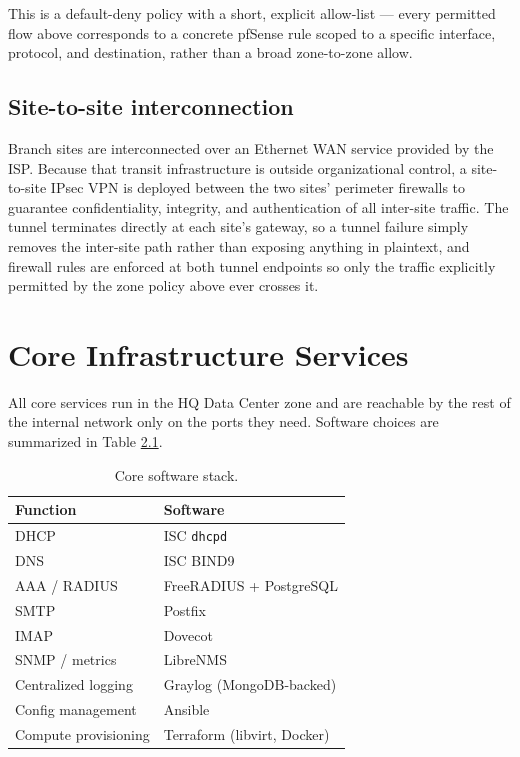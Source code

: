 \documentclass[11pt,a4paper]{report}
\begin{document}
This is a default-deny policy with a short, explicit allow-list --- every
permitted flow above corresponds to a concrete pfSense rule scoped to a
specific interface, protocol, and destination, rather than a broad
zone-to-zone allow.

\section{Site-to-site interconnection}

Branch sites are interconnected over an Ethernet WAN service provided by
the ISP. Because that transit infrastructure is outside organizational
control, a site-to-site IPsec VPN is deployed between the two sites'
perimeter firewalls to guarantee confidentiality, integrity, and
authentication of all inter-site traffic. The tunnel terminates directly at
each site's gateway, so a tunnel failure simply removes the inter-site path
rather than exposing anything in plaintext, and firewall rules are enforced
at both tunnel endpoints so only the traffic explicitly permitted by the
zone policy above ever crosses it.

\chapter{Core Infrastructure Services}

All core services run in the HQ Data Center zone and are reachable by the
rest of the internal network only on the ports they need. Software choices
are summarized in Table \ref{tab:software}.

\begin{table}[htbp]
\centering
\begin{tabular}{ll}
\toprule
Function & Software \\
\midrule
DHCP & ISC \texttt{dhcpd} \\
DNS & ISC BIND9 \\
AAA / RADIUS & FreeRADIUS + PostgreSQL \\
SMTP & Postfix \\
IMAP & Dovecot \\
SNMP / metrics & LibreNMS \\
Centralized logging & Graylog (MongoDB-backed) \\
Config management & Ansible \\
Compute provisioning & Terraform (libvirt, Docker) \\
\bottomrule
\end{tabular}
\caption{Core software stack.}
\label{tab:software}
\end{table}
\end{document}
